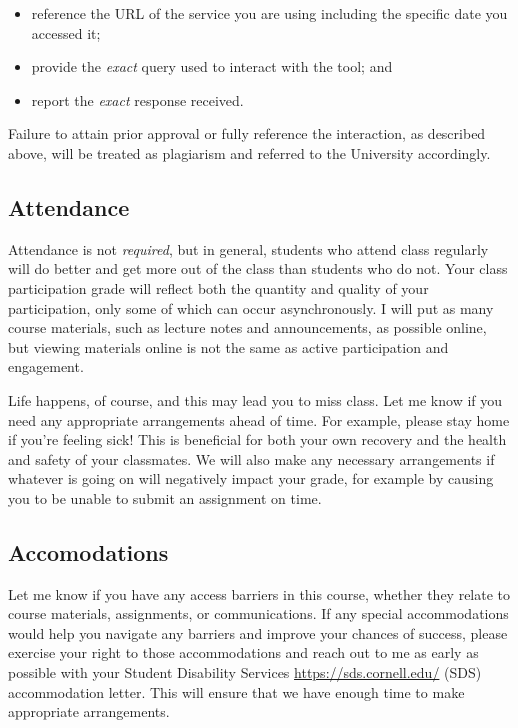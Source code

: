 \documentclass[12pt,a4paper]{article}
\begin{document}
\begin{itemize}
\item reference the URL of the service you are using including the specific date you accessed it; 


\item provide the \emph{exact} query used to interact with the tool; and


\item report the \emph{exact} response received. 

\end{itemize}
Failure to attain prior approval or fully reference the interaction, as described above, will be treated as plagiarism and referred to the University accordingly.

\subsection{Attendance}
Attendance is not \emph{required}, but in general, students who attend class regularly will do better and get more out of the class than students who do not. Your class participation grade will reflect both the quantity and quality of your participation, only some of which can occur asynchronously. I will put as many course materials, such as lecture notes and announcements, as possible online, but viewing materials online is not the same as active participation and engagement.

Life happens, of course, and this may lead you to miss class. Let me know if you need any appropriate arrangements ahead of time. For example, please stay home if you're feeling sick! This is beneficial for both your own recovery and the health and safety of your classmates. We will also make any necessary arrangements if whatever is going on will negatively impact your grade, for example by causing you to be unable to submit an assignment on time.

\subsection{Accomodations}
Let me know if you have any access barriers in this course, whether they relate to course materials, assignments, or communications. If any special accommodations would help you navigate any barriers and improve your chances of success, please exercise your right to those accommodations and reach out to me as early as possible with your Student Disability Services \href{https://sds.cornell.edu/}{https://sds.cornell.edu/} (SDS) accommodation letter. This will ensure that we have enough time to make appropriate arrangements.
\end{document}
